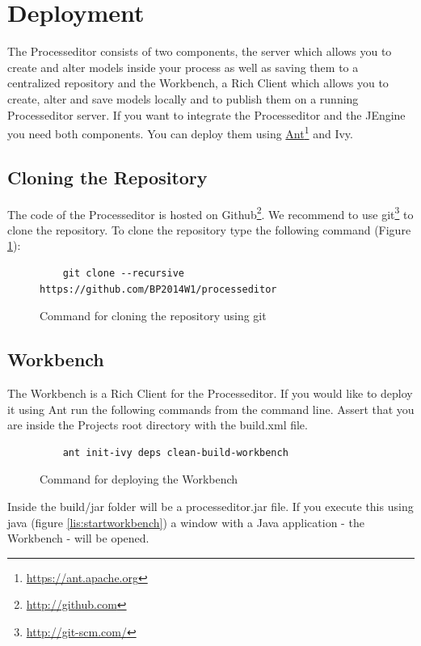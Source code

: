 \section{Deployment}

The Processeditor consists of two components, the server which allows you to create and alter models inside your process as well as saving them to a centralized repository and the Workbench, a Rich Client which allows you to create, alter and save models locally and to publish them on a running Processeditor server.
If you want to integrate the Processeditor and the JEngine you need both components.
You can deploy them using \href{https://ant.apache.org}{Ant}\footnote{\url{https://ant.apache.org}} and Ivy.

\subsection{Cloning the Repository}

The code of the Processeditor is hosted on Github\footnote{\url{http://github.com}}.
We recommend to use git\footnote{\url{http://git-scm.com/}} to clone the repository.
To clone the repository type the following command (Figure \ref{lis:clone}):

\begin{figure}[h!]
\begin{verbatim}
	git clone --recursive https://github.com/BP2014W1/processeditor
\end{verbatim}
\caption{Command for cloning the repository using git}
\label{lis:clone}
\end{figure}

\subsection{Workbench}

The Workbench is a Rich Client for the Processeditor.
If you would like to deploy it using Ant run the following commands from the command line. Assert that you are inside the Projects root directory with the build.xml file.

\begin{figure}[h!]
\begin{verbatim}
	ant init-ivy deps clean-build-workbench
\end{verbatim}
\caption{Command for deploying the Workbench}
\label{lis:depw}
\end{figure}

Inside the build/jar folder will be a processeditor.jar file. If you execute this using java (figure \ref{lis:startworkbench}) a window with a Java application - the Workbench - will be opened.


